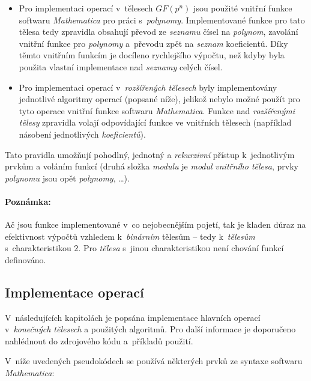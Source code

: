 \documentclass[thesis=M,czech,hidelinks]{FITthesis}[2012/06/26]
\newcommand{\0}{{\textcolor[gray]{0.75}{0}}}
\begin{document}
\begin{itemize}
    \item Pro implementaci operací v~tělesech $GF(p^n)$ jsou použité vnitřní
        funkce softwaru \emph{Mathematica} pro práci s~\emph{polynomy}.
        Implementované funkce pro tato tělesa tedy zpravidla obsahují převod ze
        \emph{seznamu} čísel na \emph{polynom}, zavolání vnitřní funkce pro
        \emph{polynomy} a~převodu zpět na \emph{seznam} koeficientů. Díky těmto
        vnitřním funkcím je docíleno rychlejšího výpočtu, než kdyby byla použita
        vlastní implementace nad \emph{seznamy} celých čísel.

    \item Pro implementaci operací v~\emph{rozšířených tělesech} byly
        implementovány jednotlivé algoritmy operací (popsané níže), jelikož
        nebylo možné použít pro tyto operace vnitřní funkce softwaru
        \emph{Mathematica}. Funkce nad \emph{rozšířenými tělesy} zpravidla
        volají odpovídající funkce ve vnitřních tělesech (například násobení
        jednotlivých \emph{koeficientů}).

\end{itemize}

Tato pravidla umožňují pohodlný, jednotný a \emph{rekurzivní} přístup
k~jednotlivým prvkům a voláním funkcí (druhá složka \emph{modulu} je
\emph{modul} \emph{vnitřního tělesa}, prvky \emph{polynomu} jsou opět
\emph{polynomy}, \ldots).

\paragraph{Poznámka:} Ač jsou funkce implementované v~co nejobecnějším pojetí,
tak je kladen důraz na efektivnost výpočtů vzhledem k~\emph{binárním} tělesům --
tedy k~\emph{tělesům} s~charakteristikou $2$. Pro \emph{tělesa} s~jinou
charakteristikou není chování funkcí definováno.

\subsection{Implementace operací}

V~následujících kapitolách je popsána implementace hlavních operací
v~\emph{konečných tělesech} a použitých algoritmů. Pro další informace je
doporučeno nahlédnout do zdrojového kódu a~příkladů použití.

V~níže uvedených pseudokódech se používá některých prvků ze syntaxe softwaru
\emph{Mathematica}:
\end{document}
